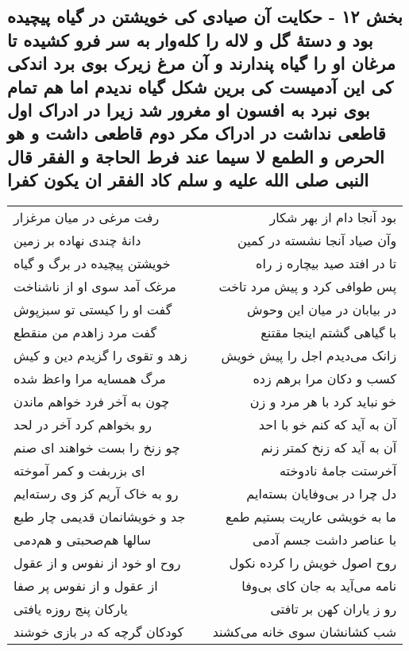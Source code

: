 \begin{center}
\section*{بخش ۱۲ - حکایت آن صیادی کی خویشتن در گیاه پیچیده بود و دستهٔ گل و لاله را کله‌وار به سر فرو کشیده تا مرغان او را گیاه پندارند و آن مرغ زیرک بوی برد اندکی کی این آدمیست کی برین شکل گیاه ندیدم اما هم تمام بوی نبرد به افسون او مغرور شد زیرا در ادراک اول قاطعی نداشت در ادراک مکر دوم قاطعی داشت و هو الحرص و الطمع لا سیما عند فرط الحاجة و الفقر قال النبی صلی الله علیه و سلم کاد الفقر ان یکون کفرا}
\label{sec:sh012}
\begin{longtable}{l p{0.5cm} r}
رفت مرغی در میان مرغزار
&&
بود آنجا دام از بهر شکار
\\
دانهٔ چندی نهاده بر زمین
&&
وآن صیاد آنجا نشسته در کمین
\\
خویشتن پیچیده در برگ و گیاه
&&
تا در افتد صید بیچاره ز راه
\\
مرغک آمد سوی او از ناشناخت
&&
پس طوافی کرد و پیش مرد تاخت
\\
گفت او را کیستی تو سبزپوش
&&
در بیابان در میان این وحوش
\\
گفت مرد زاهدم من منقطع
&&
با گیاهی گشتم اینجا مقتنع
\\
زهد و تقوی را گزیدم دین و کیش
&&
زانک می‌دیدم اجل را پیش خویش
\\
مرگ همسایه مرا واعظ شده
&&
کسب و دکان مرا برهم زده
\\
چون به آخر فرد خواهم ماندن
&&
خو نباید کرد با هر مرد و زن
\\
رو بخواهم کرد آخر در لحد
&&
آن به آید که کنم خو با احد
\\
چو زنخ را بست خواهند ای صنم
&&
آن به آید که زنخ کمتر زنم
\\
ای بزربفت و کمر آموخته
&&
آخرستت جامهٔ نادوخته
\\
رو به خاک آریم کز وی رسته‌ایم
&&
دل چرا در بی‌وفایان بسته‌ایم
\\
جد و خویشانمان قدیمی چار طبع
&&
ما به خویشی عاریت بستیم طمع
\\
سالها هم‌صحبتی و هم‌دمی
&&
با عناصر داشت جسم آدمی
\\
روح او خود از نفوس و از عقول
&&
روح اصول خویش را کرده نکول
\\
از عقول و از نفوس پر صفا
&&
نامه می‌آید به جان کای بی‌وفا
\\
یارکان پنج روزه یافتی
&&
رو ز یاران کهن بر تافتی
\\
کودکان گرچه که در بازی خوشند
&&
شب کشانشان سوی خانه می‌کشند
\\

\end{longtable}
\end{center}
